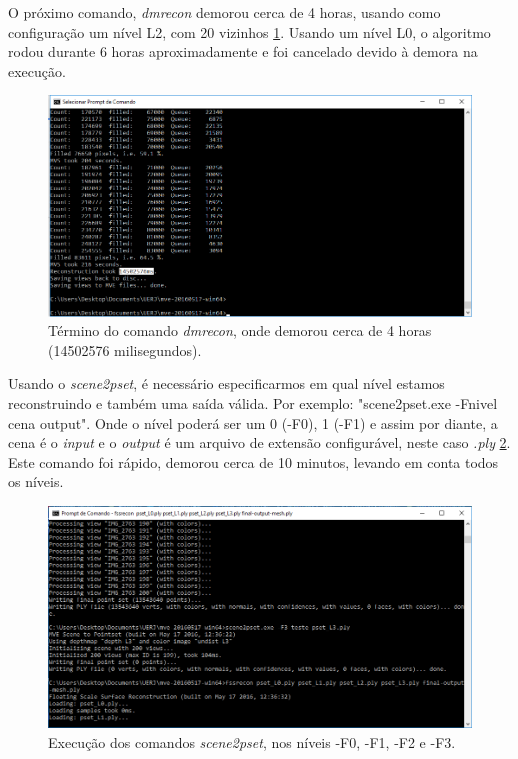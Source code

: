 O próximo comando, \emph{dmrecon} demorou cerca de 4 horas, usando como configuração um nível L2, com 20 vizinhos \ref{fig:MVEDenseRecon}. 
Usando um nível L0, o algoritmo rodou durante 6 horas aproximadamente e foi cancelado devido à demora na execução. 

\newpage

\begin{figure}[!h]
	\centering
	\includegraphics[width=0.8\linewidth]{figs/umvetempo.png}
	\caption{%
	Término do comando \emph{dmrecon}, onde demorou cerca de 4 horas (14502576 milisegundos).
	}\label{fig:MVEDenseRecon}
\end{figure} 

Usando o \emph{scene2pset}, é necessário especificarmos em qual nível estamos reconstruindo e também uma saída válida. Por exemplo: "scene2pset.exe -Fnivel cena output". Onde o nível poderá ser um 0 (-F0), 1 (-F1) e assim por diante, a cena é o \emph{input} e o \emph{output} é um arquivo de extensão configurável, neste caso \emph{.ply} \ref{fig:MVEscene2pset}. Este comando foi rápido, demorou cerca de 10 minutos, levando em conta todos os níveis.

\begin{figure}[!h]
	\centering
	\includegraphics[width=0.8\linewidth]{figs/mvemesh.png}
	\caption{%
	Execução dos comandos \emph{scene2pset}, nos níveis -F0, -F1, -F2 e -F3.
	}\label{fig:MVEscene2pset}
\end{figure} 


